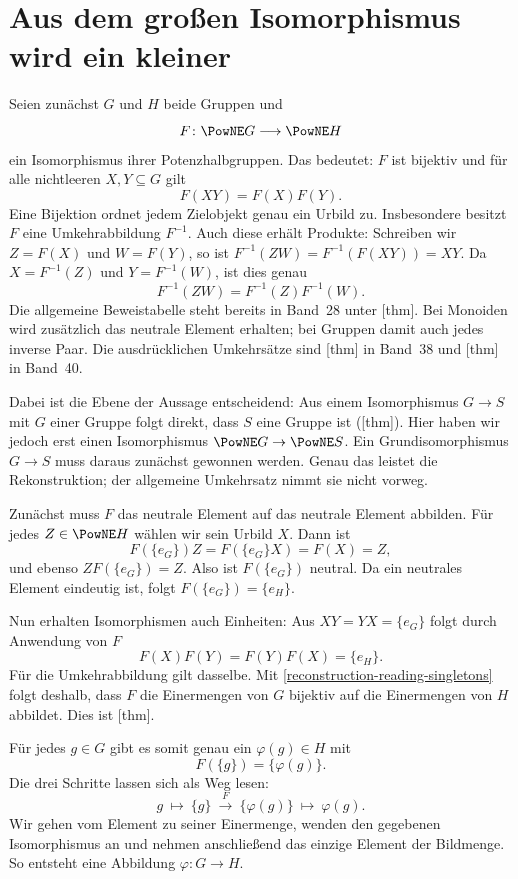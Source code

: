 \par{}
\section*{Aus dem großen Isomorphismus wird ein kleiner}
\hypertarget{reconstruction.reading.groups}{}

Seien zunächst \(G\) und \(H\) beide Gruppen und
\[
  F\colon\PowNE G\longrightarrow\PowNE H
\]
ein Isomorphismus ihrer Potenzhalbgruppen. Das bedeutet:
\(F\) ist bijektiv und für alle nichtleeren \(X,Y\subseteq G\)
gilt
\[
  F(XY)=F(X)F(Y).
\]
Eine Bijektion ordnet jedem Zielobjekt genau ein Urbild zu.
Insbesondere besitzt \(F\) eine Umkehrabbildung \(F^{-1}\).
Auch diese erhält Produkte: Schreiben wir \(Z=F(X)\) und
\(W=F(Y)\), so ist
\(F^{-1}(ZW)=F^{-1}(F(XY))=XY\).
Da \(X=F^{-1}(Z)\) und \(Y=F^{-1}(W)\), ist dies genau
\[
  F^{-1}(ZW)=F^{-1}(Z)F^{-1}(W).
\]
Die allgemeine Beweistabelle steht bereits in Band~28 unter
[thm]. Bei Monoiden wird
zusätzlich das neutrale Element erhalten; bei Gruppen damit
auch jedes inverse Paar. Die ausdrücklichen Umkehrsätze sind
[thm] in Band~38 und
[thm] in Band~40.

Dabei ist die Ebene der Aussage entscheidend: Aus einem
Isomorphismus \(G\to S\) mit \(G\) einer Gruppe folgt direkt,
dass \(S\) eine Gruppe ist
([thm]). Hier
haben wir jedoch erst einen Isomorphismus
\(\PowNE G\to\PowNE S\). Ein Grundisomorphismus \(G\to S\)
muss daraus zunächst gewonnen werden. Genau das leistet
die Rekonstruktion; der allgemeine Umkehrsatz nimmt sie
nicht vorweg.

Zunächst muss \(F\) das neutrale Element auf das neutrale
Element abbilden. Für jedes \(Z\in\PowNE H\) wählen wir
sein Urbild \(X\). Dann ist
\[
  F(\{e_G\})Z=F(\{e_G\}X)=F(X)=Z,
\]
und ebenso \(ZF(\{e_G\})=Z\). Also ist \(F(\{e_G\})\)
neutral. Da ein neutrales Element eindeutig ist, folgt
\(F(\{e_G\})=\{e_H\}\).

Nun erhalten Isomorphismen auch Einheiten: Aus \(XY=YX=\{e_G\}\)
folgt durch Anwendung von \(F\)
\[
  F(X)F(Y)=F(Y)F(X)=\{e_H\}.
\]
Für die Umkehrabbildung gilt dasselbe. Mit
\eqref{reconstruction-reading-singletons} folgt deshalb, dass
\(F\) die Einermengen von \(G\) bijektiv auf die Einermengen
von \(H\) abbildet. Dies ist
[thm].

Für jedes \(g\in G\) gibt es somit genau ein \(\varphi(g)\in H\)
mit
\begin{equation}
  F(\{g\})=\{\varphi(g)\}.
  \tag{T}\label{reconstruction-reading-transport}
\end{equation}
Die drei Schritte lassen sich als Weg lesen:
\[
  g\ \longmapsto\ \{g\}
    \ \xrightarrow{\ F\ }\ \{\varphi(g)\}
    \ \longmapsto\ \varphi(g).
\]
Wir gehen vom Element zu seiner Einermenge, wenden den gegebenen
Isomorphismus an und nehmen anschließend das einzige Element
der Bildmenge. So entsteht eine Abbildung
\(\varphi\colon G\to H\).

